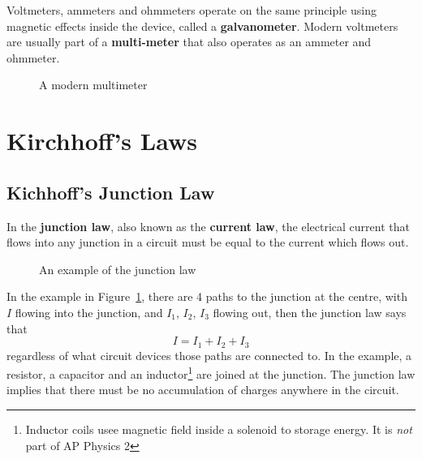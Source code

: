 Voltmeters, ammeters and ohmmeters operate on the same principle using magnetic
effects inside the device, called a \textbf{galvanometer}. Modern voltmeters
are usually part of a \textbf{multi-meter} that also operates as an ammeter
and ohmmeter.
\begin{figure}[ht]
  \centering
  \caption{A modern multimeter}
\end{figure}



\section{Kirchhoff's Laws}

\subsection{Kichhoff's Junction Law}
In the \textbf{junction law}, also known as the \textbf{current law}, the
electrical current that flows into any junction in a circuit must be equal to
the current which flows out.

\begin{figure}[ht]
  \centering
  \caption{An example of the junction law}
  \label{fig:junction-law}
\end{figure}
In the example in Figure~\ref{fig:junction-law}, there are 4 paths to the
junction at the centre, with $I$ flowing into the junction, and $I_1$, $I_2$,
$I_3$ flowing out, then the junction law says that
\begin{equation*}
  I=I_1+I_2+I_3
\end{equation*}
regardless of what circuit devices those paths are connected to. In the
example, a resistor, a capacitor and an inductor\footnote{Inductor coils usee
magnetic field inside a solenoid to storage energy. It is \emph{not} part of
AP Physics 2} are joined at the junction. The junction law implies that there
must be no accumulation of charges anywhere in the circuit.



